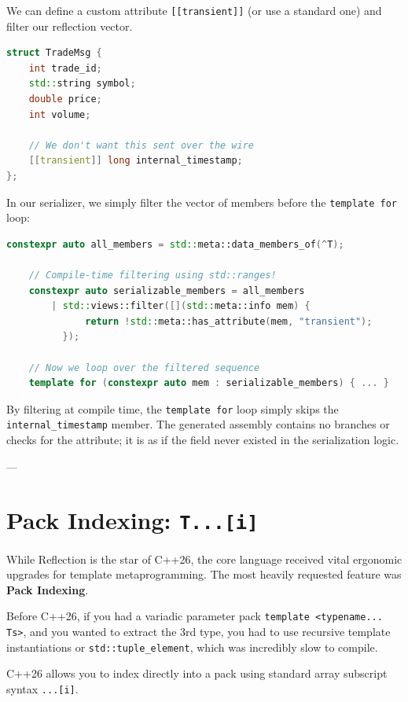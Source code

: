 We can define a custom attribute \texttt{[[transient]]} (or use a standard one) and filter our reflection vector.

\begin{lstlisting}[language=C++]
struct TradeMsg {
    int trade_id;
    std::string symbol;
    double price;
    int volume;
    
    // We don't want this sent over the wire
    [[transient]] long internal_timestamp; 
};
\end{lstlisting}

In our serializer, we simply filter the vector of members before the \texttt{template for} loop:

\begin{lstlisting}[language=C++]
    constexpr auto all_members = std::meta::data_members_of(^T);
    
    // Compile-time filtering using std::ranges!
    constexpr auto serializable_members = all_members 
        | std::views::filter([](std::meta::info mem) {
              return !std::meta::has_attribute(mem, "transient");
          });
          
    // Now we loop over the filtered sequence
    template for (constexpr auto mem : serializable_members) { ... }
\end{lstlisting}

By filtering at compile time, the \texttt{template for} loop simply skips the \texttt{internal_timestamp} member. The generated assembly contains no branches or checks for the attribute; it is as if the field never existed in the serialization logic.

---

\section{Pack Indexing: \texttt{T...[i]}}

While Reflection is the star of C++26, the core language received vital ergonomic upgrades for template metaprogramming. The most heavily requested feature was \textbf{Pack Indexing}.

Before C++26, if you had a variadic parameter pack \texttt{template <typename... Ts>}, and you wanted to extract the 3rd type, you had to use recursive template instantiations or \texttt{std::tuple_element}, which was incredibly slow to compile.

C++26 allows you to index directly into a pack using standard array subscript syntax \texttt{...[i]}.

